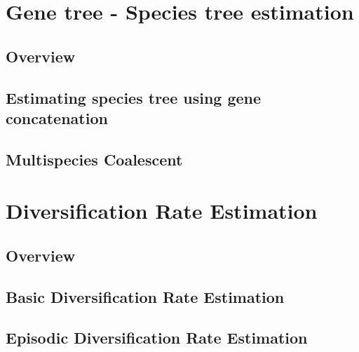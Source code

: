 \documentclass[11pt]{book}
\begin{document}
\part{Gene tree - Species tree estimation}

\chapter{Overview}
\def \ResourcePath {RB_GTST_Tutorial/}


\chapter{Estimating species tree using gene concatenation}
\def \ResourcePath {RB_GeneConcatenation_Tutorial/}


\chapter{Multispecies Coalescent}
\def \ResourcePath {RB_MultispeciesCoalescent_Tutorial/}




\part{Diversification Rate Estimation}

\chapter{Overview}
\def \ResourcePath {RB_DiversificationRateIntro_Tutorial/}


\chapter{Basic Diversification Rate Estimation}
\def \ResourcePath {RB_DiversificationRate_Tutorial/}


\chapter{Episodic Diversification Rate Estimation}
\def \ResourcePath {RB_DiversificationRate_Episodic_Tutorial/}

\end{document}
